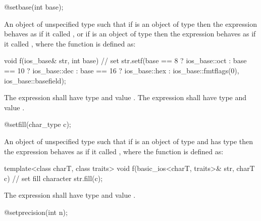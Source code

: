 %
\begin{itemdecl}
@\unspec@ setbase(int base);
\end{itemdecl}

\begin{itemdescr}
\pnum
\returns
An object of unspecified type such that if
is an object of type
then the expression
behaves as if it called
,
or if
is an object of type
then the expression
behaves as if it called
, where the function  is defined as:

\begin{codeblock}
void f(ios_base& str, int base) {
  // set 
  str.setf(base ==  8 ? ios_base::oct :
      base == 10 ? ios_base::dec :
      base == 16 ? ios_base::hex :
      ios_base::fmtflags(0), ios_base::basefield);
}
\end{codeblock}

The expression
shall have type
and value
.
The expression
shall have type
and value
.
\end{itemdescr}

%
\begin{itemdecl}
@\unspec@ setfill(char_type c);
\end{itemdecl}

\begin{itemdescr}
\pnum
\returns
An object of unspecified type such that if
is an object of type
and  has type
then the expression
behaves as if it called
, where the function  is defined as:

\begin{codeblock}
template<class charT, class traits>
void f(basic_ios<charT, traits>& str, charT c) {
  // set fill character
  str.fill(c);
}
\end{codeblock}

The expression
shall have type
and value
.
\end{itemdescr}

%
\begin{itemdecl}
@\unspec@ setprecision(int n);
\end{itemdecl}

